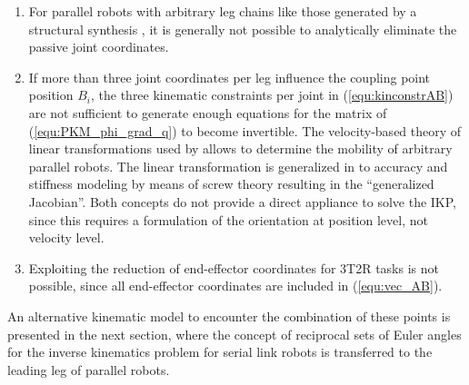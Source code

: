 \documentclass[robotics,article,submit,moreauthors,pdftex]{Definitions/mdpi}
\newcommand{\bm}[1]{\boldsymbol{#1}}
\let\Phi\varPhi
\begin{document}
\begin{enumerate}
    \item For parallel robots with arbitrary leg chains like those generated by a structural synthesis \cite{KongGos2005, Gogu2008, RamirezKotOrt2015}, it is generally not possible to analytically eliminate the passive joint coordinates.
    \item If more than three joint coordinates per leg influence the coupling point position $B_i$, the three kinematic constraints per joint in (\ref{equ:kinconstrAB}) are not sufficient to generate enough equations for the matrix of (\ref{equ:PKM_phi_grad_q}) to become invertible.
    The velocity-based theory of linear transformations used by \cite{Gogu2008} allows to determine the mobility of arbitrary parallel robots.
    The linear transformation is generalized in \cite{HuangLiuChe2011} to accuracy and stiffness modeling by means of screw theory resulting in the ``generalized Jacobian''.
    Both concepts do not provide a direct appliance to solve the IKP, since this requires a formulation of the orientation at position level, not velocity level.
    \item Exploiting the reduction of end-effector coordinates for 3T2R tasks is not possible, since all end-effector coordinates are included in (\ref{equ:vec_AB}).
\end{enumerate}
%
An alternative kinematic model to encounter the combination of these points is presented in the next section, where the concept of reciprocal sets of Euler angles for the inverse kinematics problem for serial link robots \cite{1_SchapplerTapOrt2019} is transferred to the leading leg of parallel robots.

%

\end{document}
